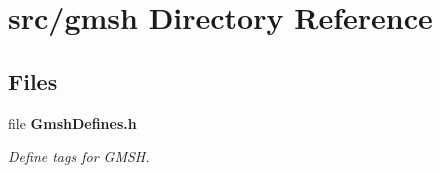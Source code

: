 \section{src/gmsh Directory Reference}
\label{dir_4c44d7f95855d5dbb1a480c13b3fe01e}
\subsection*{Files}
\begin{DoxyCompactItemize}
\item 
file {\bf Gmsh\-Defines.\-h}
\begin{DoxyCompactList}\small\item\em Define tags for G\-M\-S\-H. \end{DoxyCompactList}\end{DoxyCompactItemize}
